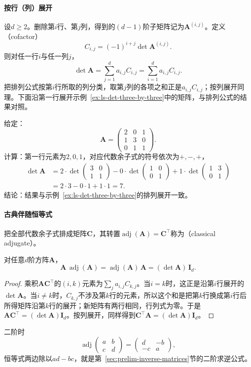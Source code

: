 \paragraph{按行（列）展开}
设$d\geq2$。删除第$i$行、第$j$列，得到的$(d-1)$阶子矩阵记为$\bm A^{(i,j)}$。定义（cofactor）
\[
 C_{i,j}=(-1)^{i+j}\det\bm A^{(i,j)}.
\]
则对任一行$i$与任一列$j$，
\[
 \det\bm A=\sum_{j=1}^d a_{i,j}C_{i,j}=\sum_{i=1}^d a_{i,j}C_{i,j}.
\]
把排列公式按第$i$行所取的列分类，取第$j$列的各项之和正是$a_{i,j}C_{i,j}$；按列展开同理。下面沿第一行展开示例~\ref{ex:ls-det-three-by-three}中的矩阵，与排列公式的结果对照。
\begin{example}[沿第一行展开三阶行列式]
\label{ex:ls-det-cofactor-expansion}
给定：
\[
 \bm A=\begin{pmatrix}2&0&1\\1&3&0\\0&1&1\end{pmatrix}.
\]
计算：第一行元素为$2,0,1$，对应代数余子式的符号依次为$+,-,+$，
\[
 \begin{aligned}
 \det\bm A
 &=2\cdot\det\begin{pmatrix}3&0\\1&1\end{pmatrix}
 -0\cdot\det\begin{pmatrix}1&0\\0&1\end{pmatrix}
 +1\cdot\det\begin{pmatrix}1&3\\0&1\end{pmatrix}\\
 &=2\cdot3-0\cdot1+1\cdot1=7.
 \end{aligned}
\]
结论：结果与示例~\ref{ex:ls-det-three-by-three}的排列展开一致。
\end{example}

\paragraph{古典伴随恒等式}
把全部代数余子式排成矩阵$\bm C$，其转置$\operatorname{adj}(\bm A)=\bm C^\top$称为（classical adjugate）。
\begin{theorem}[古典伴随恒等式]
\label{thm:ls-adjugate-identity}
对任意$d$阶方阵$\bm A$，
\[
 \bm A\,\operatorname{adj}(\bm A)
 =\operatorname{adj}(\bm A)\,\bm A
 =(\det\bm A)\,\bm I_d.
\]
\end{theorem}
\begin{proof}
乘积$\bm A\bm C^\top$的$(i,k)$元素为$\sum_j a_{i,j}C_{k,j}$。当$i=k$时，这正是沿第$i$行展开的$\det\bm A$。当$i\neq k$时，$C_{k,j}$不涉及第$k$行的元素，所以这个和是把第$k$行换成第$i$行后所得矩阵沿第$k$行的展开；新矩阵有两行相同，行列式为零。于是$\bm A\bm C^\top=(\det\bm A)\bm I_d$。按列展开，同样得到$\bm C^\top\bm A=(\det\bm A)\bm I_d$。
\end{proof}
二阶时
\[
 \operatorname{adj}\begin{pmatrix}a&b\\c&d\end{pmatrix}=\begin{pmatrix}d&-b\\-c&a\end{pmatrix},
\]
恒等式两边除以$ad-bc$，就是第~\ref{sec:prelim-inverse-matrices}节的二阶求逆公式。

